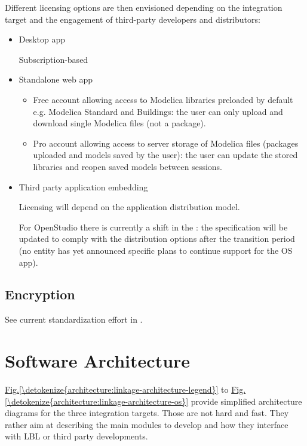 \documentclass[letterpaper,10pt, openany,english]{sphinxmanual}
\begin{document}
Different licensing options are then envisioned depending on the integration target and the engagement of third-party developers and distributors:
\begin{itemize}
\item {} 
Desktop app

Subscription-based

\item {} 
Standalone web app
\begin{itemize}
\item {} 
Free account allowing access to Modelica libraries preloaded by default e.g. Modelica Standard and Buildings: the user can only upload and download single Modelica files (not a package).

\item {} 
Pro account allowing access to server storage of Modelica files (packages uploaded and models saved by the user): the user can update the stored libraries and reopen saved models between sessions.

\end{itemize}

\item {} 
Third party application embedding

Licensing will depend on the application distribution model.

For OpenStudio there is currently a shift in the : the specification will be updated to comply with the distribution options after the transition period (no entity has yet announced specific plans to continue support for the OS app).

\end{itemize}


\section{Encryption}
\label{\detokenize{requirements:encryption}}

See current standardization effort in .


\chapter{Software Architecture}
\label{\detokenize{architecture:software-architecture}}\label{\detokenize{architecture:sec-architecture}}\label{\detokenize{architecture::doc}}
\hyperref[\detokenize{architecture:linkage-architecture-legend}]{Fig.\@ \ref{\detokenize{architecture:linkage-architecture-legend}}} to \hyperref[\detokenize{architecture:linkage-architecture-os}]{Fig.\@ \ref{\detokenize{architecture:linkage-architecture-os}}} provide simplified architecture diagrams for the three integration targets.
Those are not hard and fast. They rather aim at describing the main modules to develop and how they interface with LBL or third party developments.
\end{document}

